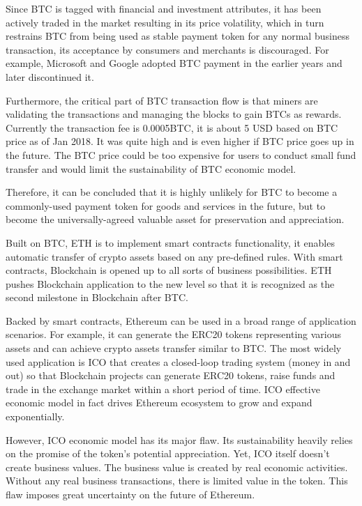 \documentclass[fleqn,10pt]{SelfArx} %
\begin{document}
Since BTC is tagged with financial and investment attributes, it has been actively traded in the market resulting in its price volatility, which in turn restrains BTC from being used as stable payment token for any normal business transaction, its acceptance by consumers and merchants is discouraged. For example, Microsoft and Google adopted BTC payment in the earlier years and later discontinued it.

Furthermore, the critical part of BTC transaction flow is that miners are validating the transactions and managing the blocks to gain BTCs as rewards. Currently the transaction fee is 0.0005BTC, it is about 5 USD based on BTC price as of Jan 2018. It was quite high and is even higher if BTC price goes up in the future. The BTC price could be too expensive for users to conduct small fund transfer and would limit the sustainability of BTC economic model. 

Therefore, it can be concluded that it is highly unlikely for BTC to become a commonly-used payment token for goods and services in the future, but to become the universally-agreed valuable asset for preservation and appreciation. \\


Built on BTC, ETH is to implement smart contracts functionality, it enables automatic transfer of crypto assets based on any pre-defined rules. With smart contracts, Blockchain is opened up to all sorts of business possibilities. ETH pushes Blockchain application to the new level so that it is recognized as the second milestone in Blockchain after BTC.

Backed by smart contracts, Ethereum can be used in a broad range of application scenarios. For example, it can generate the ERC20 tokens representing various assets and can achieve crypto assets transfer similar to BTC. The most widely used application is ICO that creates a closed-loop trading system (money in and out) so that Blockchain projects can generate ERC20 tokens, raise funds and trade in the exchange market within a short period of time. ICO effective economic model in fact drives Ethereum ecosystem to grow and expand exponentially.

However, ICO economic model has its major flaw. Its sustainability heavily relies on the promise of the token’s potential appreciation. Yet, ICO itself doesn’t create business values. The business value is created by real economic activities. Without any real business transactions, there is limited value in the token. This flaw imposes great uncertainty on the future of Ethereum.
	
\end{document}

